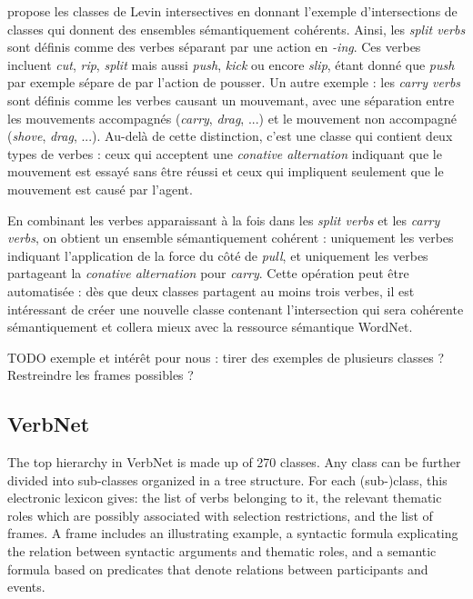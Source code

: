 \cite{dang1998investigating} propose les classes de Levin intersectives en
donnant l'exemple d'intersections de classes qui donnent des ensembles
sémantiquement cohérents. Ainsi, les \textit{split verbs} sont définis comme
des verbes séparant par une action en \textit{-ing}. Ces verbes incluent
\textit{cut}, \textit{rip}, \textit{split} mais aussi \textit{push},
\textit{kick} ou encore \textit{slip}, étant donné que \textit{push} par
exemple sépare de par l'action de pousser. Un autre exemple : les \textit{carry
verbs} sont définis comme les verbes causant un mouvemant, avec une séparation
entre les mouvements accompagnés (\textit{carry}, \textit{drag}, ...) et le
mouvement non accompagné (\textit{shove}, \textit{drag}, ...). Au-delà de cette
distinction, c'est une classe qui contient deux types de verbes : ceux qui
acceptent une \textit{conative alternation} indiquant que le mouvement est
essayé sans être réussi et ceux qui impliquent seulement que le mouvement est
causé par l'agent.

En combinant les verbes apparaissant à la fois dans les \textit{split verbs} et
les \textit{carry verbs}, on obtient un ensemble sémantiquement cohérent :
uniquement les verbes indiquant l'application de la force du côté de
\textit{pull}, et uniquement les verbes partageant la \textit{conative
alternation} pour \textit{carry}. Cette opération peut être automatisée : dès
que deux classes partagent au moins trois verbes, il est intéressant de créer
une nouvelle classe contenant l'intersection qui sera cohérente sémantiquement
et collera mieux avec la ressource sémantique WordNet.


TODO exemple et intérêt pour nous : tirer des exemples de plusieurs classes ?
Restreindre les frames possibles ?

\subsection{VerbNet}

The top hierarchy in VerbNet is made up of 270 classes. Any class can be
further divided into sub-classes organized in a tree structure. For each
(sub-)class, this electronic lexicon gives:  the list of verbs belonging to it,
the relevant thematic roles which are possibly associated with selection
restrictions, and the list of frames. A frame includes an illustrating example,
a syntactic formula explicating the relation between syntactic arguments and
thematic roles, and a semantic formula  based on predicates that denote
relations between participants and events.


